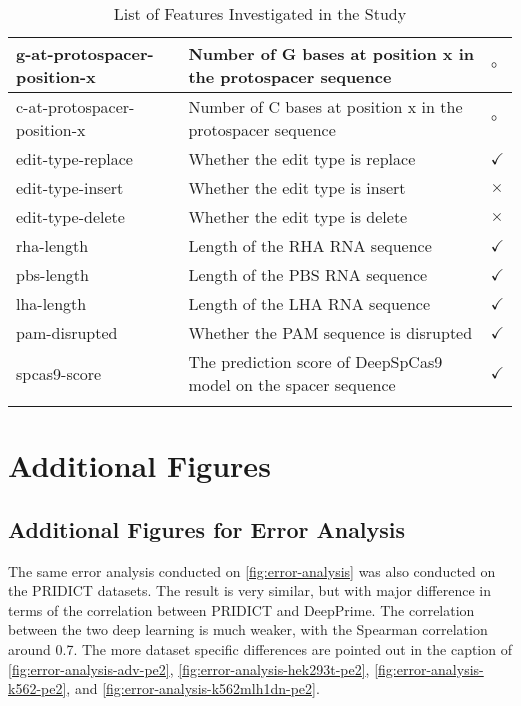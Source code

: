 \begin{longtable}{|p{}|p{}|p{}|}
    \hline
    g-at-protospacer-position-x & Number of G bases at position x in the protospacer sequence & $\circ$ \\
    \hline
    c-at-protospacer-position-x & Number of C bases at position x in the protospacer sequence & $\circ$ \\
    \hline
    edit-type-replace & Whether the edit type is replace & $\checkmark$ \\
    \hline
    edit-type-insert & Whether the edit type is insert & $\times$ \\
    \hline
    edit-type-delete & Whether the edit type is delete & $\times$ \\
    \hline
    rha-length & Length of the RHA RNA sequence & $\checkmark$ \\
    \hline
    pbs-length & Length of the PBS RNA sequence & $\checkmark$ \\
    \hline
    lha-length & Length of the LHA RNA sequence & $\checkmark$ \\
    \hline
    pam-disrupted & Whether the PAM sequence is disrupted & $\checkmark$ \\
    \hline
    spcas9-score & The prediction score of DeepSpCas9 model on the spacer sequence & $\checkmark$ \\
    \hline
    \caption{List of Features Investigated in the Study}
    \label{table:features}
\end{longtable}


\chapter{Additional Figures}
\label{appendix:additional-figures}

\section{Additional Figures for Error Analysis}
\label{appendix:error-analysis-figures}





The same error analysis conducted on \autoref{fig:error-analysis} was also conducted on the PRIDICT datasets. The result is very similar, but with major difference in terms of the correlation between PRIDICT and DeepPrime. The correlation between the two deep learning is much weaker, with the Spearman correlation around 0.7. The more dataset specific differences are pointed out in the caption of \autoref{fig:error-analysis-adv-pe2}, \autoref{fig:error-analysis-hek293t-pe2}, \autoref{fig:error-analysis-k562-pe2}, and \autoref{fig:error-analysis-k562mlh1dn-pe2}.

